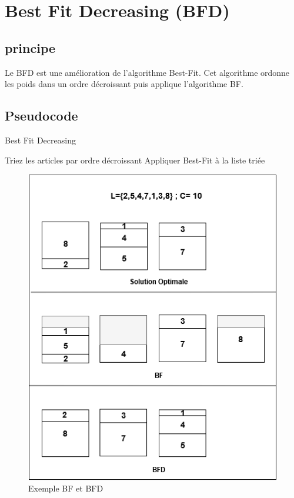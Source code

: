 \documentclass[12pt]{article}
\begin{document}
\section{Best Fit Decreasing (BFD)}
\subsection{principe}
Le BFD est une amélioration de l’algorithme Best-Fit. Cet algorithme ordonne les poids dans un ordre décroissant puis applique l’algorithme BF.

\subsection{Pseudocode}

\begin{algorithm}[!h]
    \caption{Best Fit Decreasing }
    \begin{algorithmic}
        \STATE Triez les articles par ordre décroissant
        \STATE Appliquer Best-Fit à la liste triée 
    \end{algorithmic}
\end{algorithm}


\begin{figure}[H]
    \includegraphics[width=\linewidth]{../figures/BF BFD.png}
    \caption{Exemple BF et BFD}
\end{figure}
\newpage
\end{document}
